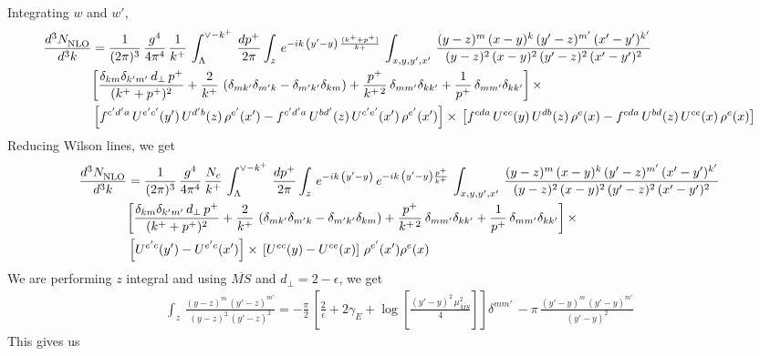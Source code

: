 \documentclass[9pt]{article}
\numberwithin{equation}{section}
\begin{document}
Integrating $w$ and $w'$,
\begin{align}
     \frac{d^{3}N_{\rm NLO}^{\rm}}{d^{3}k}  & = \frac{1}{(2\pi)^{3}}\,\frac{g^{4}}{4\pi^{4}}\,\frac{1}{k^{+}}\,\int_{\Lambda}^{\vee-k^{+}}\, \frac{dp^{+}}{2\pi}\int_{z}\,e^{-ik\,\left(y'-y\right)\, \frac{(k^{+}+p^{+})}{k{+}}}\,\int_{x,y,y^{\prime},x'}\,\frac{(y-z)^{m}\,(x-y)^{k}\,(y'-z)^{m'}\,(x'-y')^{k'}}{(y-z)^{2}\,(x-y)^{2}\,(y'-z)^{2}\,(x'-y')^{2}}\notag \\ &  \bigg[\frac{\delta_{km}\delta_{k'm'}\,d_{\perp}\,p^{+}}{(k^{+}+p^{+})^{2}}+\frac{2}{k^{+}}\,\left(\delta_{mk'}\delta_{m'k}-\delta_{m'k'}\delta_{km}\right) + \frac{p^{+}}{k^{+\,2}}\,\delta_{mm'}\delta_{kk'}+\frac{1}{p^{+}}\,\delta_{mm'}\delta_{kk'}\bigg]\,\times\,\notag \\ & \left[f^{c'd'a}\,U^{e'c'}(y')\,U^{d'b}(z)\,\rho^{e'}(x')-f^{c'd'a}\, 
    U^{bd'}(z)\,U^{c'e'}(x')\,\rho^{e'}(x')\right]\times\, \left[f^{cda}\,U^{ec}(y)\,U^{db}(z)\,\rho^{e}(x)-f^{cda}\, 
    U^{bd}(z)\,U^{ce}(x)\,\rho^{e}(x)\right]
\end{align}
Reducing Wilson lines, we get
\begin{align}
     \frac{d^{3}N_{\rm NLO}^{\rm}}{d^{3}k}  & = \frac{1}{(2\pi)^{3}}\,\frac{g^{4}}{4\pi^{4}}\,\frac{N_{c}}{k^{+}}\,\int_{\Lambda}^{\vee-k^{+}}\, \frac{dp^{+}}{2\pi}\int_{z}\,e^{-ik\,\left(y'-y\right)}\,e^{-ik\,\left(y'-y\right)\frac{p^{+}}{k^{+}}}\,\int_{x,y,y^{\prime},x'}\,\frac{(y-z)^{m}\,(x-y)^{k}\,(y'-z)^{m'}\,(x'-y')^{k'}}{(y-z)^{2}\,(x-y)^{2}\,(y'-z)^{2}\,(x'-y')^{2}}\notag \\ &  \bigg[\frac{\delta_{km}\delta_{k'm'}\,d_{\perp}\,p^{+}}{(k^{+}+p^{+})^{2}}+\frac{2}{k^{+}}\,\left(\delta_{mk'}\delta_{m'k}-\delta_{m'k'}\delta_{km}\right) + \frac{p^{+}}{k^{+\,2}}\,\delta_{mm'}\delta_{kk'}+\frac{1}{p^{+}}\,\delta_{mm'}\delta_{kk'}\bigg]\,\times\,\notag \\ & \left[U^{e'c}(y') - U^{e'c}(x')\right] \times\, \left[U^{ec}(y) - U^{ce}(x)\right]\, \rho^{e'}(x') \rho^{e}(x)
\end{align}
We are performing $z$ integral and using $\overline{MS}$ and $d_{\perp} = 2-\epsilon$, we get
\begin{align}
    \int_{z}\, \frac{(y-z)^{m}\,(y'-z)^{m'}}{(y-z)^{2}\,(y'-z)^{2}} = -\frac{\pi}{2}\, \left[\frac{2}{\epsilon} +2\gamma_{E} + \log{\left[\frac{(y'-y)^{2}\,\mu^{2}_{\overline{MS}}}{4}\right]}\right]\delta^{mm'}\, - \pi\, \frac{(y'-y)^{m}\,(y'-y)^{m'}}{(y'-y)^{2}}
\end{align}
This gives us
\end{document}
